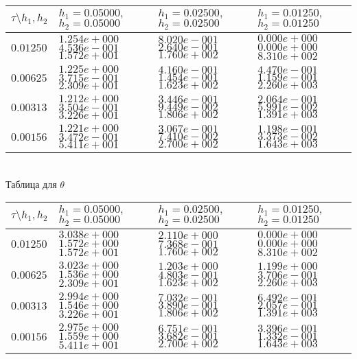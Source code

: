 \documentclass[a4paper]{article}
\theoremstyle{definition}
\numberwithin{equation}{section}
\begin{document}
\begin{center}
\begin{tabular}{|p{0.8in}|p{1.2in}|p{1.2in}|p{1.2in}|} \hline
$\tau\setminus h_1, h_2$ & $h_1=0.05000 ,$ $h_2=0.05000$& $h_1=0.02500 ,$ $h_2=0.02500$& $h_1=0.01250 ,$ $h_2=0.01250$ \\ \hline

$0.01250$ & $1.254e+000$ $4.536e-001$ $1.572e+001$ &$8.020e-001$ $2.640e-001$ $1.760e+002$ &$0.000e+000$ $0.000e+000$ $8.310e+002$  \\ \hline
$0.00625$ & $1.225e+000$ $3.715e-001$ $2.309e+001$ &$4.160e-001$ $1.454e-001$ $1.623e+002$ &$4.470e-001$ $1.159e-001$ $2.260e+003$  \\ \hline
$0.00313$ & $1.212e+000$ $3.504e-001$ $3.226e+001$ &$3.446e-001$ $9.449e-002$ $1.806e+002$ &$2.064e-001$ $5.991e-002$ $1.391e+003$  \\ \hline
$0.00156$ & $1.221e+000$ $3.472e-001$ $5.411e+001$ &$3.067e-001$ $7.410e-002$ $2.700e+002$ &$1.198e-001$ $3.373e-002$ $1.643e+003$  \\ \hline
\end{tabular}\\[20pt]

Таблица для $\theta$
  
\begin{tabular}{|p{0.8in}|p{1.2in}|p{1.2in}|p{1.2in}|} \hline
$\tau\setminus h_1, h_2$ & $h_1=0.05000 ,$ $h_2=0.05000$& $h_1=0.02500 ,$ $h_2=0.02500$& $h_1=0.01250 ,$ $h_2=0.01250$ \\ \hline

$0.01250$ & $3.038e+000$ $1.572e+000$ $1.572e+001$ &$2.110e+000$ $7.368e-001$ $1.760e+002$ &$0.000e+000$ $0.000e+000$ $8.310e+002$  \\ \hline
$0.00625$ & $3.023e+000$ $1.536e+000$ $2.309e+001$ &$1.203e+000$ $4.803e-001$ $1.623e+002$ &$1.199e+000$ $3.706e-001$ $2.260e+003$  \\ \hline
$0.00313$ & $2.994e+000$ $1.546e+000$ $3.226e+001$ &$7.032e-001$ $3.890e-001$ $1.806e+002$ &$6.492e-001$ $2.057e-001$ $1.391e+003$  \\ \hline
$0.00156$ & $2.975e+000$ $1.559e+000$ $5.411e+001$ &$6.751e-001$ $3.682e-001$ $2.700e+002$ &$3.396e-001$ $1.332e-001$ $1.643e+003$  \\ \hline
\end{tabular}\\[20pt]
\end{center}
\newpage
\end{document}
